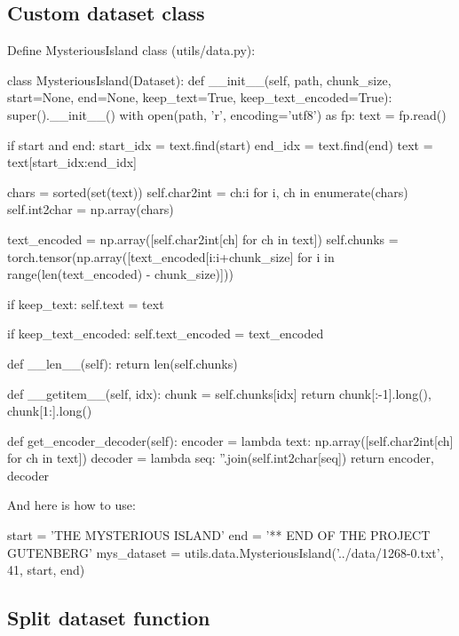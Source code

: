 \subsection{Custom dataset class}

Define MysteriousIsland class (utils/data.py):

\begin{pythoncode}
class MysteriousIsland(Dataset):
    def __init__(self, path, chunk_size, start=None, end=None, keep_text=True, keep_text_encoded=True):
        super().__init__()
        with open(path, 'r', encoding='utf8') as fp:
            text = fp.read()

        if start and end:
            start_idx = text.find(start)
            end_idx = text.find(end)
            text = text[start_idx:end_idx]

        chars = sorted(set(text))
        self.char2int = {ch:i for i, ch in enumerate(chars)}
        self.int2char = np.array(chars)

        text_encoded = np.array([self.char2int[ch] for ch in text])
        self.chunks = torch.tensor(np.array([text_encoded[i:i+chunk_size] for i in range(len(text_encoded) - chunk_size)]))

        if keep_text:
            self.text = text
        
        if keep_text_encoded:
            self.text_encoded = text_encoded

    def __len__(self):
        return len(self.chunks)
    
    def __getitem__(self, idx):
        chunk = self.chunks[idx]
        return chunk[:-1].long(), chunk[1:].long()
    
    def get_encoder_decoder(self):
        encoder = lambda text: np.array([self.char2int[ch] for ch in text])
        decoder = lambda seq: ''.join(self.int2char[seq])
        return encoder, decoder
\end{pythoncode}

And here is how to use:

\begin{pythoncode}
start = 'THE MYSTERIOUS ISLAND'
end = '\n\n*** END OF THE PROJECT GUTENBERG'
mys_dataset = utils.data.MysteriousIsland('../data/1268-0.txt', 41, start, end)
\end{pythoncode}

\subsection{Split dataset function}

